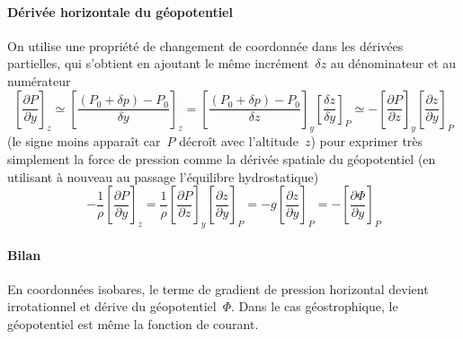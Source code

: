 \sk
\paragraph{Dérivée horizontale du géopotentiel} On utilise une propriété de changement de coordonnée dans les dérivées partielles,
qui s'obtient en ajoutant le même incrément~$\delta z$ au dénominateur et au numérateur
\[ 
\left[ \frac{\partial P}{\partial y} \right]_z
\simeq
\left[ \frac{(P_0 + \delta p) - P_0}{\delta y} \right]_z 
=
\left[ \frac{(P_0 + \delta p) - P_0}{\delta z} \right]_y
\left[ \frac{\delta z}{\delta y} \right]_P
\simeq
-\left[ \frac{\partial P}{\partial z} \right]_y \left[ \frac{\partial z}{\partial y} \right]_P
\]
(le signe moins apparaît car~$P$ décroît avec l'altitude~$z$) pour exprimer très simplement la force de pression comme la dérivée spatiale du géopotentiel (en utilisant à nouveau au passage l'équilibre hydrostatique)
\[ -\frac{1}{\rho} \left[ \frac{\partial P}{\partial y} \right]_z
= \frac{1}{\rho} \left[ \frac{\partial P}{\partial z} \right]_y \left[ \frac{\partial z}{\partial y} \right]_P
= -g \left[ \frac{\partial z}{\partial y} \right]_P
= -\left[ \frac{\partial \Phi}{\partial y} \right]_P
\]

\sk
\paragraph{Bilan} En coordonnées isobares, 
le terme de gradient de pression horizontal devient irrotationnel
et dérive du géopotentiel~$\Phi$.
Dans le cas géostrophique, le géopotentiel est même la fonction de courant.
